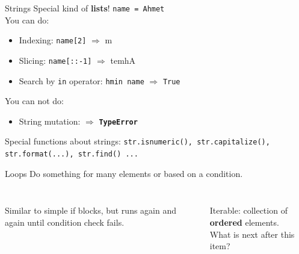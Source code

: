         \begin{frame}{Strings}
            \LARGE
            Special kind of \textbf{lists}! \texttt{name = \textquotesingle Ahmet\textquotesingle\\}
            You can do:
            \begin{itemize}
                \item Indexing: \texttt{name[2]} $\Rightarrow$ \textquotesingle m\textquotesingle
                \item Slicing: \texttt{name[::-1]} $\Rightarrow$ \textquotesingle temhA\textquotesingle
                \item Search by \texttt{in} operator: \texttt{\textquotesingle hm\textquotesingle in name} $\Rightarrow$ \texttt{True}
            \end{itemize}
            You can not do:
            \begin{itemize}
                \item String mutation:  $\Rightarrow$ \textbf{\texttt{TypeError}}
            \end{itemize}
            Special functions about strings: \texttt{str.isnumeric(), str.capitalize(), str.format(...), str.find() ...}
        \end{frame}

        \begin{frame}{Loops}
            \LARGE Do something for many elements or based on a condition.
            \begin{columns}
                \begin{column}{0.5\textwidth}
                    \inputminted[frame=single,framesep=2pt]{python3}{../Lecture3/code-examples/while1.py}
                    Similar to simple if blocks, but runs again and again until condition check fails.
                \end{column}
                \begin{column}{0.5\textwidth}
                    \inputminted[frame=single,framesep=2pt]{python3}{../Lecture3/code-examples/for1.py}
                    Iterable: collection of \textbf{ordered} elements.\\
                    What is next after this item?\\
                \end{column}
            \end{columns}
        \end{frame}

